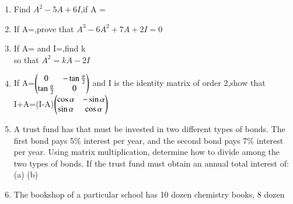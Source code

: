 \begin{enumerate}[label=\arabic*.,ref=\thesubsection.\theenumi]
\\
(ii)$\myvec{1 &2 &3\\0 &1 &0\\1 &1 &0}\myvec{-1 &1 &0\\0 &-1 &1\\2 &3 &4}\neq \myvec{-1 &1 &0\\0 &-1 &1\\2 &3 &4}\myvec{1 &2 &3\\0 &1 &0\\1 &1 &0}$\\
\solution 


\item Find $A^{2}-5A+6I$,if A = \\
\solution 

\item If A=,prove that $A^3-6A^2+7A+2I=0$\\
\solution 

\item If A= and I=,find k\\
 so that $A^2=kA-2I$\\
\solution 

\item If A=$\begin{pmatrix}0 &-\tan\frac{\alpha}{2}\\  \tan\frac{\alpha}{2} &0\end{pmatrix}$ and I is the identity matrix of order 2,show that \\I+A=(I-A)$\begin{pmatrix}\cos\alpha &-\sin\alpha\\\sin\alpha &\cos\alpha\end{pmatrix}$\\
\solution 

\item A trust fund has  that must be invested in two different types of bonds.
The first bond pays 5\% interest per year, and the second bond pays 7\% interest
per year. Using matrix multiplication, determine how to divide  among
the two types of bonds. If the trust fund must obtain an annual total interest of:\\
(a)  (b)\\
\solution 

\item The bookshop of a particular school has 10 dozen chemistry books, 8 dozen

\end{enumerate}
